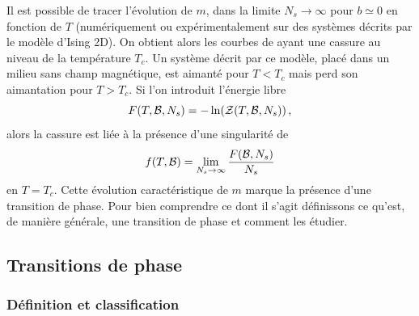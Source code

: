 \documentclass[10.5pt]{article}
\begin{document}
\begin{multicols*}{2}
\begin{figure}[H]
\end{figure} 
\vspace*{-11pt}
Il est possible de tracer l'évolution de $m$, dans la limite $N_s \to \infty$ pour $b \simeq 0$ en fonction de $T$ (numériquement ou expérimentalement sur des systèmes décrits par le modèle d'Ising 2D). On obtient alors les courbes de  ayant une cassure au niveau de la température $T_c$.  Un système décrit par ce modèle, placé dans un milieu sans champ magnétique, est aimanté pour $T<T_c$ mais perd son aimantation pour $T>T_c$. Si l'on introduit l'énergie libre
\begin{equation}
F(T, \mathcal{B}, N_s) = -\ln(\mathcal{Z}(T, \mathcal{B}, N_s))\, ,	
\end{equation}
alors la cassure est liée à la présence d'une singularité de 
\begin{equation}
f(T, \mathcal{B}) = \lim_{N_s \to \infty} \frac{F(\mathcal{B}, N_s)}{N_s}
\end{equation} 
en $T=T_c$.
Cette évolution caractéristique de $m$ marque la présence d'une transition de phase. Pour bien comprendre  ce dont il s'agit définissons ce qu'est, de manière générale, une transition de phase et comment les étudier. \\









\subsection{Transitions de phase}
\subsubsection{Définition et classification}


\end{multicols*}
\end{document}
